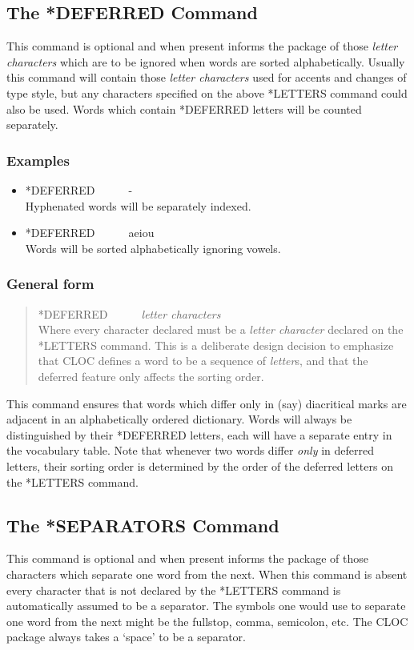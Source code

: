 \subsection{The *DEFERRED Command}
This command is optional and when present informs the package of
those {\em letter characters} which are to be ignored when words are sorted
alphabetically.  Usually this command will contain those
{\em letter characters} used for accents and changes
of type style, but any characters specified on the above *LETTERS
command could also be used. Words which contain *DEFERRED letters will
be counted separately.

\subsubsection{Examples}
\begin{itemize}
\item *DEFERRED~~~~~~-\\
Hyphenated words will be separately indexed.
\item *DEFERRED~~~~~~aeiou\\
Words will be sorted alphabetically ignoring vowels.
\end{itemize}

\subsubsection{General form}
\begin{quote}
*DEFERRED~~~~~~{\em letter characters}\\
Where every character declared must be a {\em letter character} declared
on the *LETTERS command. This is a deliberate design decision to emphasize
that CLOC defines a word to be a sequence of {\em letter}s, and that the
deferred feature only affects the sorting order.
\end{quote}

This command ensures that words which differ only in (say) diacritical
marks are adjacent in an alphabetically ordered dictionary.
Words will always be distinguished by their *DEFERRED letters, each will have
a separate entry in the vocabulary table.
Note that whenever two words differ {\em only} in deferred letters,
their sorting order is determined by the order of the deferred
letters on the *LETTERS command.

\subsection{The *SEPARATORS Command}
This command is optional and when present informs the package of
those characters which separate one word from the next.  When this command
is absent every character that is not declared by the *LETTERS command
is automatically assumed to be a separator.  The symbols one would use
to separate one word from the next might be the fullstop, comma,
semicolon, etc.  The CLOC package always takes a `space' to be a
separator.

